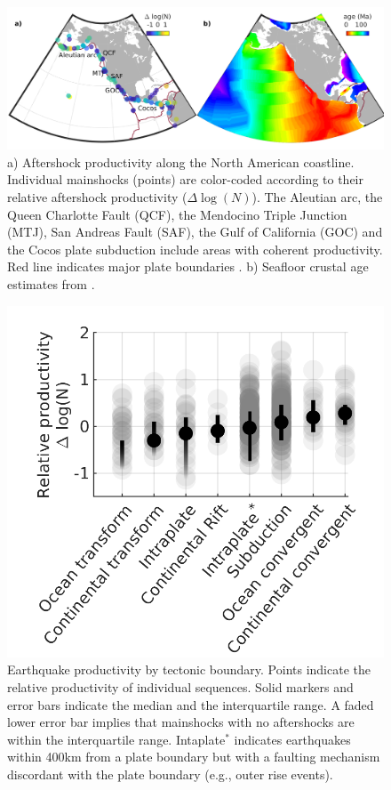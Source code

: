 \documentclass[draft]{agujournal}
\begin{document}
\begin{figure}[H]
\centering
\includegraphics[width=\linewidth]{figures/regions_mw5.png}
\caption{a) Aftershock productivity  along the North American coastline.  Individual mainshocks (points) are color-coded according to their relative aftershock productivity ($\Delta \log(N)$). The Aleutian arc, the Queen Charlotte Fault (QCF), the Mendocino Triple Junction (MTJ), San Andreas Fault (SAF), the Gulf of California (GOC) and the Cocos plate subduction include areas with coherent productivity. Red line indicates major plate boundaries \citep{Bird2003AnBoundaries}. b) Seafloor crustal age estimates from \citet{Muller2008}.}
\label{fig:region}
\end{figure}  

\begin{figure}[H]
\centering
\includegraphics{figures/prod_by_pb_mw5.png}
\caption{Earthquake productivity  by tectonic boundary. Points indicate the relative productivity of individual sequences. Solid markers and error bars indicate the median and the interquartile range. A faded lower error bar implies that mainshocks with no aftershocks are within the interquartile range. Intaplate$^*$ indicates earthquakes within 400km from a plate boundary but with a faulting mechanism discordant with the plate boundary (e.g., outer rise events).}
\label{fig:plate_boundary}
\end{figure}    
\end{document}
